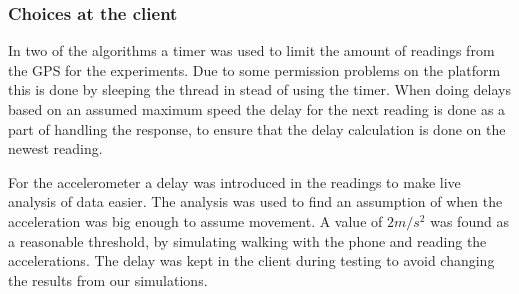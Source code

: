 \subsubsection{Choices at the client}
In two of the algorithms a timer was used to limit the amount of readings from the GPS for the experiments. Due to some permission problems on the platform this is done by sleeping the thread in stead of using the timer. When doing delays based on an assumed maximum speed the delay for the next reading is done as a part of handling the response, to ensure that the delay calculation is done on the newest reading.

For the accelerometer a delay was introduced in the readings to make live analysis of data easier. The analysis was used to find an assumption of when the acceleration was big enough to assume movement. A value of $2 m/s^2$ was found as a reasonable threshold, by simulating walking with the phone and reading the accelerations. The delay was kept in the client during testing to avoid changing the results from our simulations.